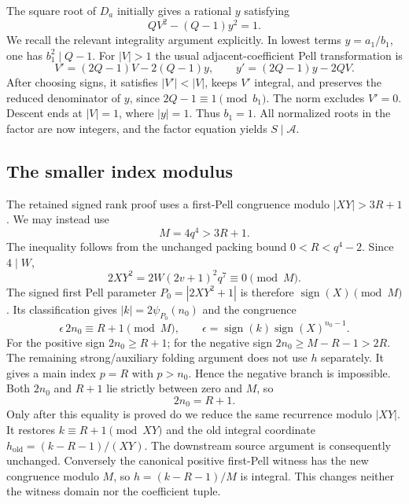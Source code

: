 The square root of $D_a$ initially gives a rational $y$ satisfying
\begin{equation}\label{eq:adjacent-norm}
 QV^2-(Q-1)y^2=1.
\end{equation}
We recall the relevant integrality argument explicitly. In lowest terms
$y=a_1/b_1$, one has $b_1^2\mid Q-1$. For $|V|>1$ the usual
adjacent-coefficient Pell transformation is
\[
 V'=(2Q-1)V-2(Q-1)y,\qquad
 y'=(2Q-1)y-2QV.
\]
After choosing signs, it satisfies $|V'|<|V|$, keeps $V'$ integral, and
preserves the reduced denominator of $y$, since $2Q-1\equiv1\pmod{b_1}$.
The norm excludes $V'=0$. Descent ends at $|V|=1$, where $|y|=1$.
Thus $b_1=1$. All normalized roots in the factor are now integers, and
the factor equation yields $S\mid\mathcal A$.

\subsection{The smaller index modulus}
The retained signed rank proof uses a first-Pell congruence modulo
$|XY|>3R+1$. We may instead use
\[
 M=4q^4>3R+1.
\]
The inequality follows from the unchanged packing bound
$0<R<q^4-2$. Since $4\mid W$,
\[
 2XY^2=2W(2v+1)^2q^7\equiv0\pmod M.
\]
The signed first Pell parameter $P_0=|2XY^2+1|$ is therefore
$\operatorname{sign}(X)\pmod M$. Its classification gives
$|k|=2\psi_{P_0}(n_0)$ and the congruence
\[
 \epsilon\,2n_0\equiv R+1\pmod M,
 \qquad
 \epsilon=\operatorname{sign}(k)\operatorname{sign}(X)^{n_0-1}.
\]
For the positive sign $2n_0\ge R+1$; for the negative sign
$2n_0\ge M-R-1>2R$. The remaining strong/auxiliary folding argument
does not use $h$ separately. It gives a main index $p=R$ with $p>n_0$.
Hence the negative branch is impossible. Both $2n_0$ and $R+1$ lie
strictly between zero and $M$, so
\[
 2n_0=R+1.
\]
Only after this equality is proved do we reduce the same recurrence
modulo $|XY|$. It restores $k\equiv R+1\pmod{XY}$ and the old integral
coordinate $h_{\mathrm{old}}=(k-R-1)/(XY)$. The downstream source
argument is consequently unchanged. Conversely the canonical positive
first-Pell witness has the new congruence modulo $M$, so
$h=(k-R-1)/M$ is integral. This changes neither the witness domain nor
the coefficient tuple.

